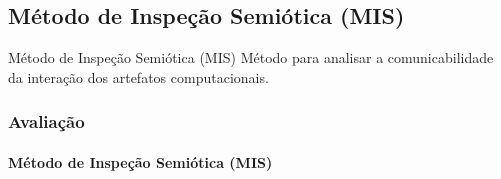 \documentclass[14pt,beamer]{beamer}
\begin{document}
\begin{frame}
\end{frame}

\subsection{Método de Inspeção Semiótica (MIS)}
\begin{frame}
    \begin{block}{Método de Inspeção Semiótica (MIS)}
        Método para analisar a comunicabilidade da 
        interação dos artefatos computacionais.
    \end{block}
\end{frame}
\begin{frame}
	\frametitle{Avaliação}
	\framesubtitle{Método de Inspeção Semiótica (MIS)}


\end{frame}
\end{document}
